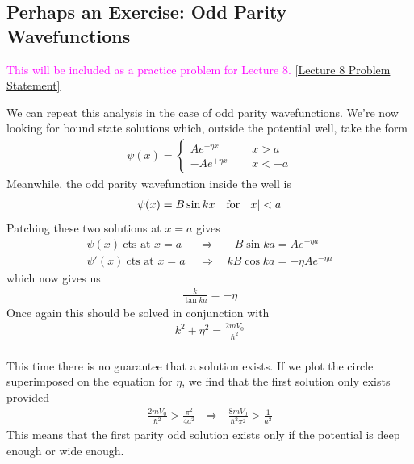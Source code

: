 \documentclass[12pt]{article}
\def\be{\begin{eqnarray}}
\def\ee{\end{eqnarray}}
\newcommand{\nn}{\nonumber}
\newcommand\para{\paragraph{}}
\newcommand{\cblue}{\color{blue}}
\newcommand{\alyssa}{\textcolor{magenta}}
\begin{document}
\subsection*{Perhaps an Exercise: Odd Parity Wavefunctions}
\alyssa{This will be included as a practice problem for Lecture 8.} \href{https://drive.google.com/file/d/1mXMniOTgfhR4k8XUgV0cop9buB_VE7zs/view?usp=drive_link}{[Lecture 8 Problem Statement]}
{\cblue




We can repeat this analysis in the case of odd parity wavefunctions. We're now looking for bound state solutions which, outside the potential well, take the form
%
\be \psi(x) = \left\{\begin{array}{cc} A e^{-\eta x}\ \ \ &\ \ \ {x>a}\\-Ae^{+\eta x}\ \ \ & \ \ \ x<-a\end{array}\right.\nn\ee
%
Meanwhile, the odd parity wavefunction inside the well is
%
\be \psi(x) = B\sin kx\ \ \ {\rm for} \ \  |x|< a\nn\ee
%
Patching these two solutions at $x=a$ gives
%
\be \psi(x)\ \mbox{cts at $x=a$}\ \ \  &\Longrightarrow& \ \ \ \ \ B\sin ka = Ae^{-\eta a} \nn\\ 
\psi'(x)\ \mbox{cts at $x=a$}\ \ \  &\Longrightarrow& \ \ kB\cos ka = -\eta Ae^{-\eta a}\nn \ee
%
which now gives us
%
\be \frac{k}{\tan ka} = -\eta\nn\ee
%
Once again this should be solved in conjunction with 
%
\be k^2 + \eta^2 = \frac{2mV_0}{\hbar^2}\nn\ee
%


\para
This time there is no guarantee that a solution exists. If we plot the circle superimposed on the equation for $\eta$, we find that the first solution only exists provided 
%
\be \frac{2m V_0}{\hbar^2} > \frac{\pi^2}{4a^2}\ \ \ \Longrightarrow\ \ \ \frac{8mV_0}{\hbar^2\pi^2} > \frac{1}{a^2}\nn\ee
%
This means that the first parity odd solution exists only if the potential is deep enough or wide enough.}
\end{document}
